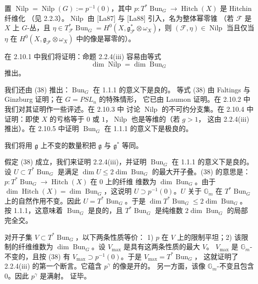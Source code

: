 置 $\operatorname{Nilp}=\operatorname{Nilp}(G):=p^{-1}(0)$，其中
$p:T^{*}\operatorname{Bun}_G\to\operatorname{Hitch}(X)$ 是 Hitchin 纤维化
（见 2.2.3）。$\operatorname{Nilp}$ 由 [La87] 与 [La88] 引入，名为整体幂零锥
（若 $\mathcal{F}$ 是 $X$ 上 $G$-丛，且
$\eta\in T^{*}_{\mathcal{F}}\operatorname{Bun}_G
=H^0(X,\mathfrak{g}^{*}_{\mathcal{F}}\otimes\omega_X)$，则
$(\mathcal{F},\eta)\in\operatorname{Nilp}$ 当且仅当 $\eta$ 在
$H^0(X,\mathfrak{g}_{\mathcal{F}}\otimes\omega_X)$ 中的像是幂零的）。


在 2.10.1 中我们将证明：命题 2.2.4(iii) 容易由等式
\begin{equation}\tag{38}
\dim\operatorname{Nilp}=\dim\operatorname{Bun}_G
\end{equation}
推出。

我们还由 (38) 推出：$\operatorname{Bun}_G$ 在 1.1.1 的意义下是良的。
等式 (38) 由 Faltings 与 Ginzburg 证明；在 $G=PSL_n$ 的特殊情形，
它已由 Laumon 证明。在 2.10.2 中我们对其证明作一些评述。在 2.10.3 中
讨论 $\operatorname{Nilp}$ 的不可约分支集。在 2.10.4 中证明：即使 $X$
的亏格等于 $0$ 或 $1$，$\operatorname{Nilp}$ 也是等维的（若 $g>1$，
这由 2.2.4(iii) 推出）。在 2.10.5 中证明 $\operatorname{Bun}_G$ 在 1.1.1
的意义下是极良的。

我们将用 $\mathfrak{g}$ 上不变的数量积把 $\mathfrak{g}$ 与
$\mathfrak{g}^*$ 等同。

 假定 (38) 成立，我们来证明 2.2.4(iii)，并证明
$\operatorname{Bun}_G$ 在 1.1.1 的意义下是良的。设
$U\subset T^{*}\operatorname{Bun}_G$ 是满足
$\dim U\le 2\dim\operatorname{Bun}_G$ 的最大开子叠。(38) 的意思是：
$p:T^{*}\operatorname{Bun}_G\to\operatorname{Hitch}(X)$ 在 $0$ 上的纤维
维数为 $\dim\operatorname{Bun}_G$。由于
$\dim\operatorname{Hitch}(X)=\dim\operatorname{Bun}_G$，这说明
$U\supset p^{-1}(0)$。$U$ 关于 $\mathbb{G}_m$ 在
$T^{*}\operatorname{Bun}_G$ 上的自然作用不变。因此
$U=T^{*}\operatorname{Bun}_G$。于是
$\dim T^{*}\operatorname{Bun}_G\le 2\dim\operatorname{Bun}_G$。
按 1.1.1，这意味着 $\operatorname{Bun}_G$ 是良的，且
$T^{*}\operatorname{Bun}_G$ 是纯维数 $2\dim\operatorname{Bun}_G$
的局部完全交。

对开子集 $V\subset T^{*}\operatorname{Bun}_G$，以下两条性质等价：
1) $p$ 在 $V$ 上的限制平坦；2) 该限制的纤维维数为
$\dim\operatorname{Bun}_G$。设 $V_{\max}$ 是具有这两条性质的最大 $V$。
$V_{\max}$ 是 $\mathbb{G}_m$-不变的，且按 (38) 有
$V_{\max}\supset p^{-1}(0)$。于是 $V_{\max}=T^{*}\operatorname{Bun}_G$，
这就证明了 2.2.4(iii) 的第一个断言。它蕴含 $p^{\gamma}$ 的像是开的。
另一方面，该像 $\mathbb{G}_m$-不变且包含 $0$。因此 $p^{\gamma}$ 是满射。
证毕。

